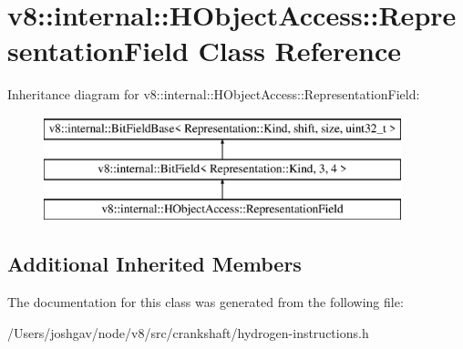 \hypertarget{classv8_1_1internal_1_1_h_object_access_1_1_representation_field}{}\section{v8\+:\+:internal\+:\+:H\+Object\+Access\+:\+:Representation\+Field Class Reference}
\label{classv8_1_1internal_1_1_h_object_access_1_1_representation_field}
Inheritance diagram for v8\+:\+:internal\+:\+:H\+Object\+Access\+:\+:Representation\+Field\+:\begin{figure}[H]
\begin{center}
\leavevmode
\includegraphics[height=3.000000cm]{classv8_1_1internal_1_1_h_object_access_1_1_representation_field}
\end{center}
\end{figure}
\subsection*{Additional Inherited Members}


The documentation for this class was generated from the following file\+:\begin{DoxyCompactItemize}
\item 
/\+Users/joshgav/node/v8/src/crankshaft/hydrogen-\/instructions.\+h\end{DoxyCompactItemize}
